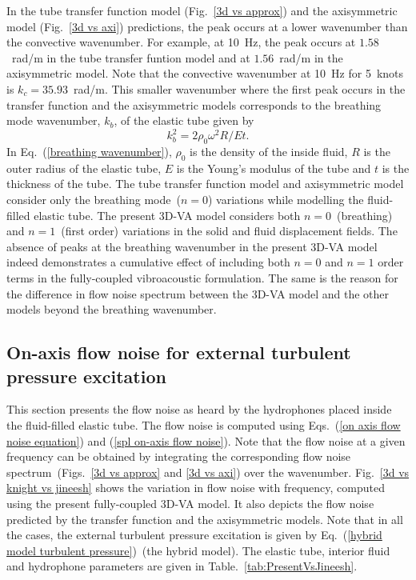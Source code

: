 \documentclass[twocolumn,10pt]{asme2ej}
\begin{document}
In the tube transfer function model (Fig.~\ref{3d vs approx}) and the axisymmetric model (Fig.~\ref{3d vs axi}) predictions, the peak occurs at a lower wavenumber than the convective wavenumber. For example, at 10~Hz, the peak occurs at $1.58$~rad/m in the tube transfer funtion model and at $1.56$~rad/m in the axisymmetric model. Note that the convective wavenumber at 10~Hz for 5~knots is $k_c = 35.93$~rad/m. This smaller wavenumber where the first peak occurs in the transfer function and the axisymmetric models corresponds to the breathing mode wavenumber, $k_b$, of the elastic tube given by~\cite{knight1996}
\begin{equation}\label{breathing wavenumber}
k_b^2 = 2\rho_0\omega^2R/Et.
\end{equation}
In Eq.~(\ref{breathing wavenumber}), $\rho_0$ is the density of the inside fluid, $R$ is the outer radius of the elastic tube, $E$ is the Young's modulus of the tube and $t$ is the thickness of the tube. The tube transfer function model and axisymmetric model consider only the breathing mode~($n=0$) variations while modelling the fluid-filled elastic tube. The present 3D-VA model considers both $n=0$~(breathing) and $n=1$~(first order) variations in the solid and fluid displacement fields. The absence of peaks at the breathing wavenumber in the present 3D-VA model indeed demonstrates a cumulative effect of including both $n=0$ and $n=1$ order terms in the fully-coupled vibroacoustic formulation. The same is the reason for the difference in flow noise spectrum between the 3D-VA model and the other models beyond the breathing wavenumber.


\subsection{On-axis flow noise for external turbulent pressure excitation}
\label{on-axis flow noise}

This section presents the flow noise as heard by the hydrophones placed inside the fluid-filled elastic tube. The flow noise is computed using Eqs.~(\ref{on axis flow noise equation}) and (\ref{spl on-axis flow noise}). Note that the flow noise at a given frequency can be obtained by integrating the corresponding flow noise spectrum~(Figs.~\ref{3d vs approx} and \ref{3d vs axi}) over the wavenumber. Fig.~\ref{3d vs knight vs jineesh} shows the variation in flow noise with frequency, computed using the present fully-coupled 3D-VA model. It also depicts the flow noise predicted by the transfer function and the axisymmetric models. Note that in all the cases, the external turbulent pressure excitation is given by Eq.~(\ref{hybrid model turbulent pressure})~(the hybrid model). The elastic tube, interior fluid and hydrophone parameters are given in Table.~\ref{tab:PresentVsJineesh}.
\end{document}
